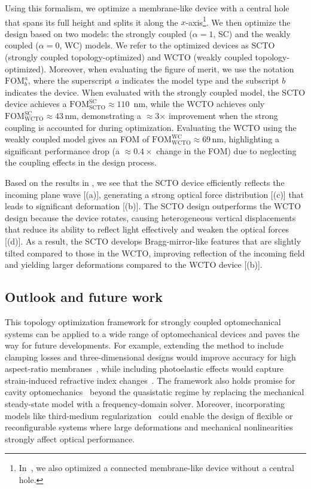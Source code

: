 Using this formalism, we optimize a membrane-like device with a central hole that spans its full height and splits it along the $x$-axis\footnote{In~\cite{ownpub5}, we also optimized a connected membrane-like device without a central hole.}. We then optimize the design based on two models: the strongly 
coupled ($\alpha = 1$, SC) and the weakly coupled ($\alpha = 0$, WC) models. We refer to the optimized devices as SCTO 
(strongly coupled topology-optimized) and WCTO (weakly coupled topology-optimized). Moreover, when evaluating the 
figure of merit, we use the notation $\text{FOM}^a_b$, where the superscript $a$ indicates the model type and the subscript $b$ indicates the device. 
When evaluated with the strongly coupled model, the SCTO device achieves a $\text{FOM}^\text{SC}_\text{SCTO}\approx 110$\, nm, while the WCTO achieves only
$\text{FOM}^\text{SC}_\text{WCTO}\approx 43$\,nm, demonstrating a $\approx$3$\times$ improvement when the strong coupling
 is accounted for during optimization. Evaluating the WCTO using the
 weakly coupled model gives an FOM of $\text{FOM}^\text{WC}_\text{WCTO}\approx$69\,nm, highlighting
 a significant performance drop (a $\approx 0.4 \times$ change in the FOM) due to neglecting the coupling effects in the design process. 
        
        
 Based on the results in , we see that the SCTO device efficiently reflects
 the incoming plane wave [(a)], generating a strong optical force distribution
 [(c)] that leads to significant deformation [(b)]. 
 The SCTO design outperforms the WCTO design because the device rotates, causing heterogeneous
 vertical displacements that reduce its ability to reflect light effectively and weaken the
 optical forces [(d)]. As a result, the SCTO develops Bragg-mirror-like features
 that are slightly tilted compared to those in the WCTO, improving reflection of the incoming field
 and yielding larger deformations compared to the WCTO device [(b)].
        

\subsection*{Outlook and future work}
This topology optimization framework for strongly coupled optomechanical systems can be applied to a wide
 range of optomechanical devices and paves the way for future developments. 
 For example, extending the method to include clamping losses and three-dimensional designs
  would improve accuracy for high aspect-ratio membranes~\cite{aspect_ratio}, while including
   photoelastic effects would capture strain-induced refractive index changes~\cite{photoelasticity}.
    The framework also holds promise for cavity optomechanics~\cite{cav_opt} beyond the quasistatic
     regime by replacing the mechanical steady-state model with a frequency-domain solver. 
     Moreover, incorporating models like third-medium regularization~\cite{HuHu0} could enable the design of
      flexible or reconfigurable systems where large deformations and mechanical nonlinearities
       strongly affect optical performance.

